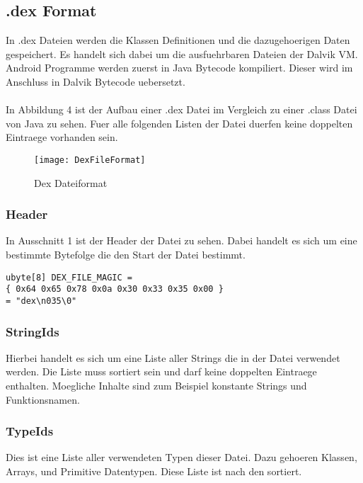 \documentclass[11pt,conference,a4paper]{IEEEtran}
\begin{document}
\subsection{.dex Format}
In .dex Dateien werden die Klassen Definitionen und die dazugehoerigen Daten gespeichert. Es handelt sich dabei um die ausfuehrbaren Dateien der Dalvik VM. Android Programme werden zuerst in Java Bytecode kompiliert. Dieser wird im Anschluss in Dalvik Bytecode uebersetzt. 
\\
\\
In Abbildung 4 ist der Aufbau einer .dex Datei im Vergleich zu einer .class Datei von Java zu sehen. Fuer alle folgenden Listen der Datei duerfen keine doppelten Eintraege vorhanden sein.

\begin{figure}
\centering
\texttt{[image: DexFileFormat]}
\caption{Dex Dateiformat\cite{1}}
\label{fig:DexFileFormat}
\end{figure}

\subsubsection{Header}
In Ausschnitt 1 ist der Header der  Datei zu sehen. Dabei handelt es sich um eine bestimmte Bytefolge die den Start der Datei bestimmt.

\begin{lstlisting}[float,floatplacement=H,caption=Dex Header\cite{2}]
ubyte[8] DEX_FILE_MAGIC = 
{ 0x64 0x65 0x78 0x0a 0x30 0x33 0x35 0x00 } 
= "dex\n035\0"

\end{lstlisting}

\subsubsection{StringIds}
Hierbei handelt es sich um eine Liste aller Strings die in der Datei verwendet werden. Die Liste muss sortiert sein und darf keine doppelten Eintraege enthalten. Moegliche Inhalte sind zum Beispiel konstante Strings und Funktionsnamen.

\subsubsection{TypeIds}
Dies ist eine Liste aller verwendeten Typen dieser Datei. Dazu gehoeren Klassen, Arrays, und Primitive Datentypen. Diese Liste ist nach den  sortiert.
\end{document}
